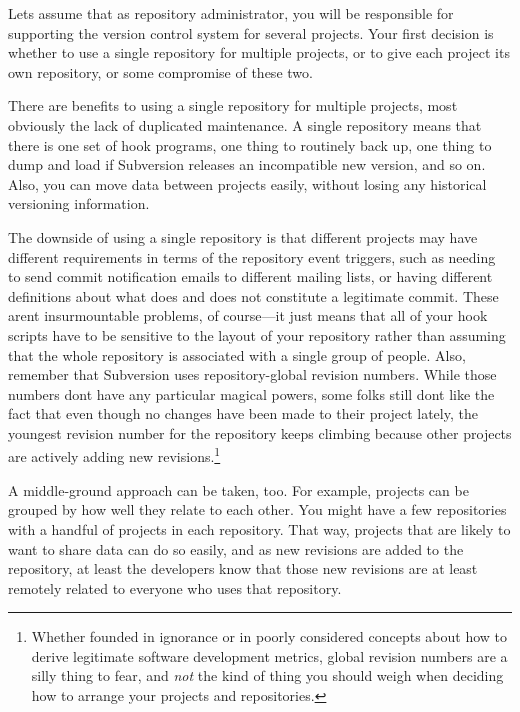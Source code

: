 Let\textquotesingle s assume that as repository administrator, you will
be responsible for supporting the version control system for several
projects. Your first decision is whether to use a single repository for
multiple projects, or to give each project its own repository, or some
compromise of these two.

There are benefits to using a single repository for multiple projects,
most obviously the lack of duplicated maintenance. A single repository
means that there is one set of hook programs, one thing to routinely
back up, one thing to dump and load if Subversion releases an
incompatible new version, and so on. Also, you can move data between
projects easily, without losing any historical versioning information.

The downside of using a single repository is that different projects may
have different requirements in terms of the repository event triggers,
such as needing to send commit notification emails to different mailing
lists, or having different definitions about what does and does not
constitute a legitimate commit. These aren\textquotesingle t
insurmountable problems, of course---it just means that all of your hook
scripts have to be sensitive to the layout of your repository rather
than assuming that the whole repository is associated with a single
group of people. Also, remember that Subversion uses repository-global
revision numbers. While those numbers don\textquotesingle t have any
particular magical powers, some folks still don\textquotesingle t like
the fact that even though no changes have been made to their project
lately, the youngest revision number for the repository keeps climbing
because other projects are actively adding new revisions.\footnote{Whether
  founded in ignorance or in poorly considered concepts about how to
  derive legitimate software development metrics, global revision
  numbers are a silly thing to fear, and \emph{not} the kind of thing
  you should weigh when deciding how to arrange your projects and
  repositories.}

A middle-ground approach can be taken, too. For example, projects can be
grouped by how well they relate to each other. You might have a few
repositories with a handful of projects in each repository. That way,
projects that are likely to want to share data can do so easily, and as
new revisions are added to the repository, at least the developers know
that those new revisions are at least remotely related to everyone who
uses that repository.

